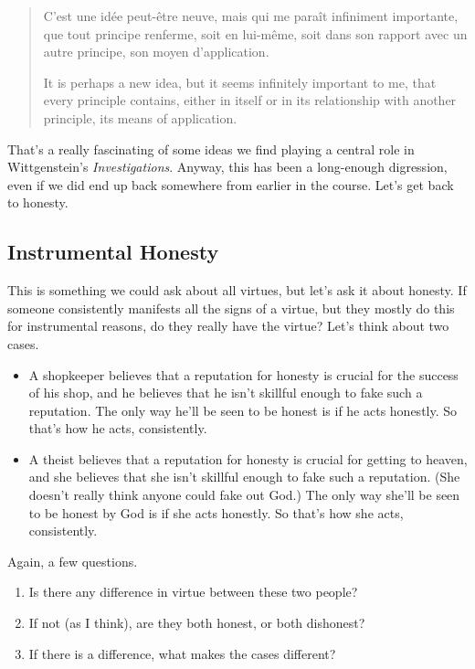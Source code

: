 \documentclass[
]{article}
\providecommand{\tightlist}{%
  \setlength{\itemsep}{0pt}\setlength{\parskip}{0pt}}
\begin{document}
\begin{quote}
C'est une idée peut-être neuve, mais qui me paraît infiniment
importante, que tout principe renferme, soit en lui-même, soit dans son
rapport avec un autre principe, son moyen d'application.

It is perhaps a new idea, but it seems infinitely important to me, that
every principle contains, either in itself or in its relationship with
another principle, its means of application.
\end{quote}

That's a really fascinating of some ideas we find playing a central role
in Wittgenstein's \emph{Investigations}. Anyway, this has been a
long-enough digression, even if we did end up back somewhere from
earlier in the course. Let's get back to honesty.

\hypertarget{instrumental-honesty}{%
\subsection{Instrumental Honesty}\label{instrumental-honesty}}

This is something we could ask about all virtues, but let's ask it about
honesty. If someone consistently manifests all the signs of a virtue,
but they mostly do this for instrumental reasons, do they really have
the virtue? Let's think about two cases.

\begin{itemize}
\tightlist
\item
  A shopkeeper believes that a reputation for honesty is crucial for the
  success of his shop, and he believes that he isn't skillful enough to
  fake such a reputation. The only way he'll be seen to be honest is if
  he acts honestly. So that's how he acts, consistently.
\item
  A theist believes that a reputation for honesty is crucial for getting
  to heaven, and she believes that she isn't skillful enough to fake
  such a reputation. (She doesn't really think anyone could fake out
  God.) The only way she'll be seen to be honest by God is if she acts
  honestly. So that's how she acts, consistently.
\end{itemize}

Again, a few questions.

\begin{enumerate}
\def\labelenumi{\arabic{enumi}.}
\tightlist
\item
  Is there any difference in virtue between these two people?
\item
  If not (as I think), are they both honest, or both dishonest?
\item
  If there is a difference, what makes the cases different?
\end{enumerate}
\end{document}
